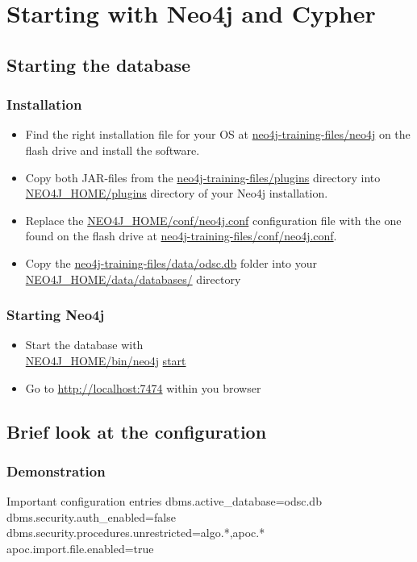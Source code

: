 \documentclass[12pt]{beamer}
\begin{document}
    \section{Starting with Neo4j and Cypher}
    \subsection{Starting the database}
    \begin{frame}
        \frametitle{Installation}
        \begin{itemize}
            \item Find the right installation file for your OS at \url{neo4j-training-files/neo4j} on the flash drive and install the software.
            \pause
            \item Copy both JAR-files from the \url{neo4j-training-files/plugins} directory into \url{NEO4J_HOME/plugins} directory of your Neo4j installation.
            \pause
            \item Replace the \url{NEO4J_HOME/conf/neo4j.conf} configuration file with the one found on the flash drive at \url{neo4j-training-files/conf/neo4j.conf}.
            \pause
            \item Copy the \url{neo4j-training-files/data/odsc.db} folder into your \url{NEO4J_HOME/data/databases/} directory
        \end{itemize}
    \end{frame}
    
    \begin{frame}
        \frametitle{Starting Neo4j}
        \begin{itemize}
            \item Start the database with\\
            \url{NEO4J_HOME/bin/neo4j} \url{start}
            \pause
            \item Go to \url{http://localhost:7474} within you browser
        \end{itemize}
    \end{frame}
    
    \subsection{Brief look at the configuration}
    \begin{frame}
        \frametitle{Demonstration}
        \begin{block}{Important configuration entries}
            dbms.active\_database=odsc.db\\
            dbms.security.auth\_enabled=false\\
            dbms.security.procedures.unrestricted=algo.*,apoc.*\\
            apoc.import.file.enabled=true
        \end{block}
    \end{frame}
    
\end{document}
